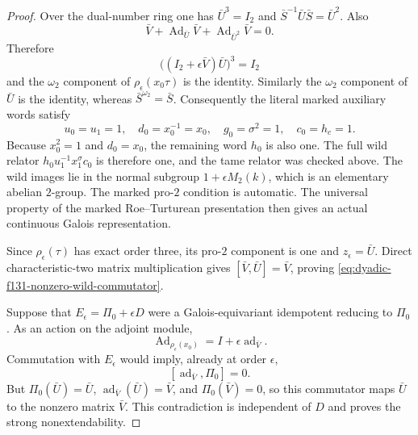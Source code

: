 \begin{proof}
Over the dual-number ring
one has
$\bar U^3=I_2$ and
$\bar S^{-1}\bar U\bar S
=\bar U^2$.
Also
\[
\bar V+\operatorname{Ad}_{\bar U}\bar V
+\operatorname{Ad}_{\bar U^2}\bar V=0.
\]
Therefore
\[
\bigl((I_2+\epsilon\bar V)\bar U\bigr)^3
=I_2
\]
and the $\omega_2$
component of
$\rho_\epsilon(x_0\tau)$
is the identity.
Similarly the
$\omega_2$ component
of $\bar U$ is the
identity, whereas
$\bar S^{\omega_2}=\bar S$.
Consequently the literal
marked auxiliary words
satisfy
\[
u_0=u_1=1,\quad
d_0=x_0^{-1}=x_0,\quad
g_0=\sigma^2=1,\quad
c_0=h_c=1.
\]
Because $x_0^2=1$ and
$d_0=x_0$, the remaining
word $h_0$ is also one.
The full wild relator
$h_0u_1^{-1}x_1^\sigma c_0$
is therefore one, and the
tame relator was checked
above.
The wild images lie in the
normal subgroup
$1+\epsilon M_2(k)$,
which is an elementary
abelian $2$-group.
The marked pro-$2$
condition is automatic.
The universal property
of the marked
Roe--Turturean presentation
then gives an actual
continuous Galois
representation.

Since $\rho_\epsilon(\tau)$
has exact order three,
its pro-$2$ component
is one and
$z_\epsilon=\bar U$.
Direct characteristic-two
matrix multiplication gives
$[\bar V,\bar U]=\bar V$,
proving
\eqref{eq:dyadic-f131-nonzero-wild-commutator}.

Suppose that
$E_\epsilon=\Pi_0+\epsilon D$
were a Galois-equivariant
idempotent reducing to
$\Pi_0$.
As an action on the
adjoint module,
\[
\operatorname{Ad}_{\rho_\epsilon(x_0)}
=I+\epsilon\operatorname{ad}_{\bar V}.
\]
Commutation with $E_\epsilon$
would imply, already
at order $\epsilon$,
\[
[\operatorname{ad}_{\bar V},\Pi_0]=0.
\]
But $\Pi_0(\bar U)=\bar U$,
$\operatorname{ad}_{\bar V}(\bar U)=\bar V$,
and $\Pi_0(\bar V)=0$,
so this commutator maps
$\bar U$ to the nonzero
matrix $\bar V$.
This contradiction is
independent of $D$ and
proves the strong
nonextendability.
\end{proof}

